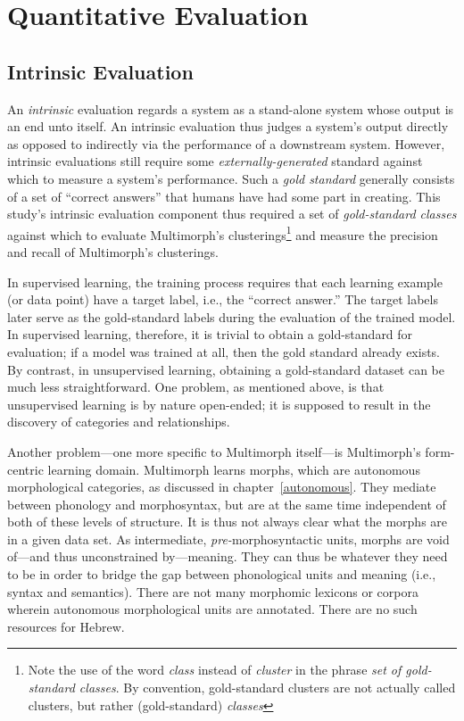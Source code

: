 \section{Quantitative Evaluation}
\subsection{Intrinsic Evaluation}
\label{sec:intrinsic}
An \emph{intrinsic} evaluation regards a system as a stand-alone system whose output is an end unto itself. An intrinsic evaluation thus judges a system's output directly as opposed to indirectly via the performance of a downstream system. However, intrinsic evaluations still require some \emph{externally-generated} standard against which to measure a system's performance. Such a \emph{gold standard} generally consists of a set of ``correct answers'' that humans have had some part in creating.
This study's intrinsic evaluation component thus required a 
set of \emph{gold-standard classes} against which to evaluate 
Multimorph's clusterings\footnote{Note the use of the word \emph{class} 
instead of \emph{cluster} in the phrase \emph{set of gold-standard classes}. 
By convention, gold-standard clusters are not actually called clusters, but rather 
(gold-standard) \emph{classes}} and measure the precision 
and recall of Multimorph's clusterings. 

In supervised learning, the training process requires that each learning example 
(or data point) have a target label, i.e., the ``correct answer.'' The target labels 
later serve as the gold-standard labels during the evaluation of the trained model. 
In supervised learning, therefore, it is trivial to obtain a gold-standard 
for evaluation; if a model was trained at all, then the gold standard 
already exists. By contrast, in unsupervised learning, obtaining a gold-standard 
dataset can be much less straightforward. One problem, as mentioned above, 
is that unsupervised learning is by nature open-ended; it is 
supposed to result in the discovery of categories and relationships.  

Another problem---one more specific to Multimorph 
itself---is
Multimorph's form-centric learning domain. Multimorph learns morphs, 
which are autonomous morphological categories, as discussed in chapter~\ref{autonomous}. 
They mediate between phonology and morphosyntax, but are at the same time independent 
of both of these levels of structure. It is thus not always clear what the morphs are in a 
given data set. As intermediate, \emph{pre-}morphosyntactic units, morphs are void 
of---and thus unconstrained by---meaning. They can thus be whatever they 
need to be in order to bridge the gap between phonological units 
and meaning (i.e., syntax and semantics).  There are not many morphomic lexicons 
or corpora wherein autonomous morphological units are annotated. There are no 
such resources for Hebrew.

